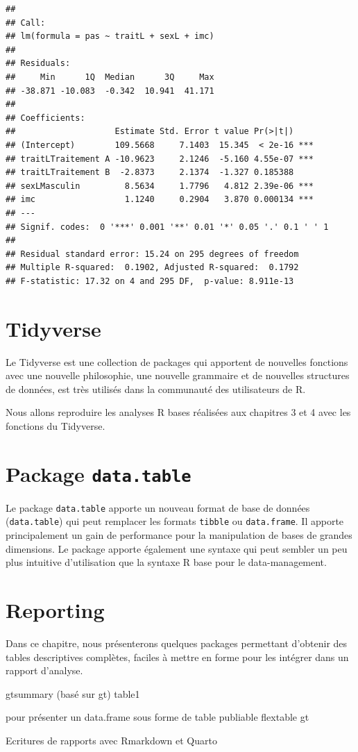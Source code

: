 \documentclass[
]{book}
\begin{document}
\begin{verbatim}
## 
## Call:
## lm(formula = pas ~ traitL + sexL + imc)
## 
## Residuals:
##     Min      1Q  Median      3Q     Max 
## -38.871 -10.083  -0.342  10.941  41.171 
## 
## Coefficients:
##                    Estimate Std. Error t value Pr(>|t|)    
## (Intercept)        109.5668     7.1403  15.345  < 2e-16 ***
## traitLTraitement A -10.9623     2.1246  -5.160 4.55e-07 ***
## traitLTraitement B  -2.8373     2.1374  -1.327 0.185388    
## sexLMasculin         8.5634     1.7796   4.812 2.39e-06 ***
## imc                  1.1240     0.2904   3.870 0.000134 ***
## ---
## Signif. codes:  0 '***' 0.001 '**' 0.01 '*' 0.05 '.' 0.1 ' ' 1
## 
## Residual standard error: 15.24 on 295 degrees of freedom
## Multiple R-squared:  0.1902, Adjusted R-squared:  0.1792 
## F-statistic: 17.32 on 4 and 295 DF,  p-value: 8.911e-13
\end{verbatim}

\chapter{Tidyverse}\label{tidyverse}

Le Tidyverse est une collection de packages qui apportent de nouvelles fonctions avec une nouvelle philosophie, une nouvelle grammaire et de nouvelles structures de données, est très utilisés dans la communauté des utilisateurs de R.

Nous allons reproduire les analyses R bases réalisées aux chapitres 3 et 4 avec les fonctions du Tidyverse.

\chapter{\texorpdfstring{Package \texttt{data.table}}{Package data.table}}\label{package-data.table}

Le package \texttt{data.table} apporte un nouveau format de base de données (\texttt{data.table}) qui peut remplacer les formats \texttt{tibble} ou \texttt{data.frame}. Il apporte principalement un gain de performance pour la manipulation de bases de grandes dimensions. Le package apporte également une syntaxe qui peut sembler un peu plus intuitive d'utilisation que la syntaxe R base pour le data-management.

\chapter{Reporting}\label{reporting}

Dans ce chapitre, nous présenterons quelques packages permettant d'obtenir des tables descriptives complètes, faciles à mettre en forme pour les intégrer dans un rapport d'analyse.

gtsummary (basé sur gt)
table1

pour présenter un data.frame sous forme de table publiable
flextable
gt

Ecritures de rapports avec Rmarkdown et Quarto
\end{document}
